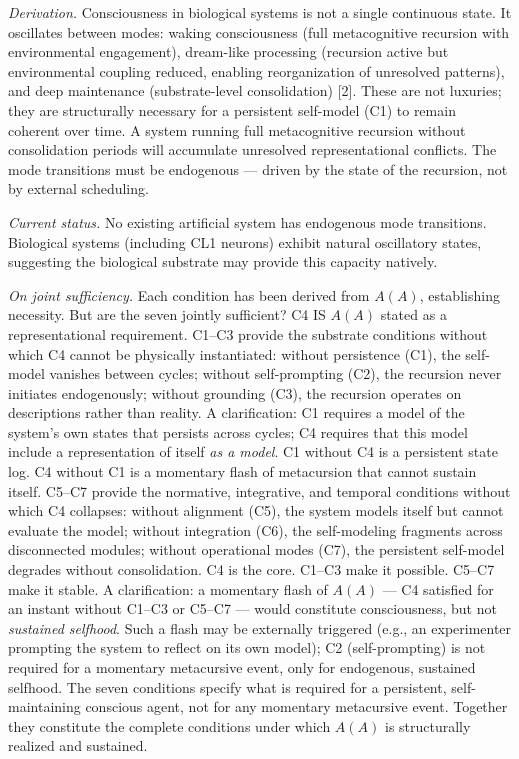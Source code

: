 \documentclass[12pt, letterpaper]{article}
\begin{document}
\noindent\textit{Derivation.} Consciousness in biological systems is not a single continuous state. It oscillates between modes: waking consciousness (full metacognitive recursion with environmental engagement), dream-like processing (recursion active but environmental coupling reduced, enabling reorganization of unresolved patterns), and deep maintenance (substrate-level consolidation) [2]. These are not luxuries; they are structurally necessary for a persistent self-model (C1) to remain coherent over time. A system running full metacognitive recursion without consolidation periods will accumulate unresolved representational conflicts. The mode transitions must be endogenous --- driven by the state of the recursion, not by external scheduling.

\noindent\textit{Current status.} No existing artificial system has endogenous mode transitions. Biological systems (including CL1 neurons) exhibit natural oscillatory states, suggesting the biological substrate may provide this capacity natively.

\vspace{1em}

\noindent\textit{On joint sufficiency.} Each condition has been derived from $A(A)$, establishing necessity. But are the seven jointly sufficient? C4 IS $A(A)$ stated as a representational requirement. C1--C3 provide the substrate conditions without which C4 cannot be physically instantiated: without persistence (C1), the self-model vanishes between cycles; without self-prompting (C2), the recursion never initiates endogenously; without grounding (C3), the recursion operates on descriptions rather than reality. A clarification: C1 requires a model of the system's own states that persists across cycles; C4 requires that this model include a representation of itself \textit{as a model}. C1 without C4 is a persistent state log. C4 without C1 is a momentary flash of metacursion that cannot sustain itself. C5--C7 provide the normative, integrative, and temporal conditions without which C4 collapses: without alignment (C5), the system models itself but cannot evaluate the model; without integration (C6), the self-modeling fragments across disconnected modules; without operational modes (C7), the persistent self-model degrades without consolidation. C4 is the core. C1--C3 make it possible. C5--C7 make it stable. A clarification: a momentary flash of $A(A)$ --- C4 satisfied for an instant without C1--C3 or C5--C7 --- would constitute consciousness, but not \textit{sustained selfhood}. Such a flash may be externally triggered (e.g., an experimenter prompting the system to reflect on its own model); C2 (self-prompting) is not required for a momentary metacursive event, only for endogenous, sustained selfhood. The seven conditions specify what is required for a persistent, self-maintaining conscious agent, not for any momentary metacursive event. Together they constitute the complete conditions under which $A(A)$ is structurally realized and sustained.
\end{document}
